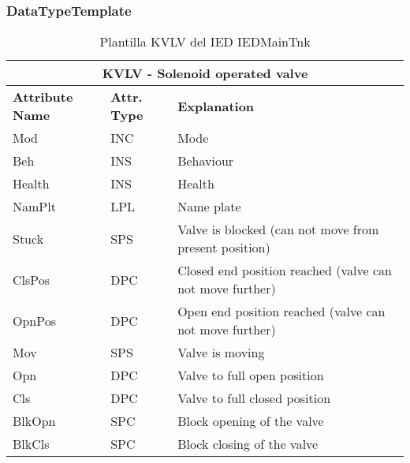     \subsubsection{DataTypeTemplate}
    \begin{table}[H]
    \begin{center}
    \begin{tabular}{|l|l|p{8.5cm}|}
            \hline
            \multicolumn{3}{|c|}{\cellcolor[gray]{0.8} \textbf{ KVLV}  - Solenoid operated valve} \\
            \hline
            \textbf{Attribute Name} & \textbf{Attr. Type} & \textbf{Explanation} \\
            \hline 
            Mod & INC & Mode \\
            \hline
            Beh & INS & Behaviour \\
            \hline
            Health & INS & Health \\
            \hline
            NamPlt & LPL & Name plate \\
            \hline
            Stuck & SPS & Valve is blocked (can not move from present position) \\
            \hline
            ClsPos & DPC & Closed end position reached (valve can not move further) \\
            \hline
            OpnPos & DPC & Open end position reached (valve can not move further) \\
            \hline
            Mov & SPS & Valve is moving \\
            \hline
            Opn & DPC & Valve to full open position \\
            \hline
            Cls & DPC & Valve to full closed position \\
            \hline
            BlkOpn & SPC & Block opening of the valve \\
            \hline
            BlkCls & SPC & Block closing of the valve \\
            \hline
    \end{tabular}
    \caption{Plantilla KVLV del IED IEDMainTnk}
    \label{table:lnTypeKVLV_solenoid_operated}
    \end{center}
    \end{table}
    
    
    